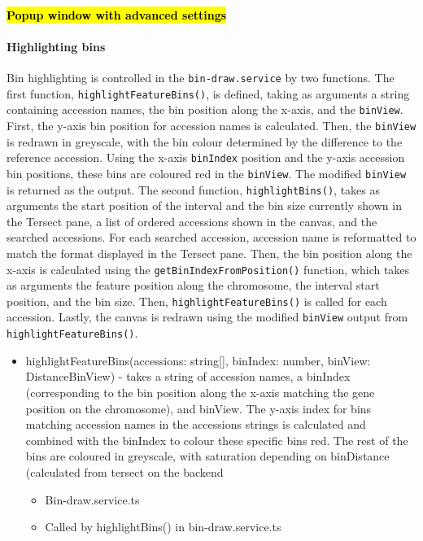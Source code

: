 \documentclass[12pt]{article}
\begin{document}
\begin{itemize}
\paragraph{\hl{Popup window with advanced settings }}
\paragraph{Highlighting bins}
Bin highlighting is controlled in the \verb+bin-draw.service+ by two functions. The first function, \verb+highlightFeatureBins()+, is defined, taking as arguments a string containing accession names, the bin position along the x-axis, and the \verb+binView+. First, the y-axis bin position for accession names is calculated. Then, the \verb+binView+ is redrawn in greyscale, with the bin colour determined by the difference to the reference accession. Using the x-axis \verb+binIndex+ position and the y-axis accession bin positions, these bins are coloured red in the \verb+binView+. The modified \verb+binView+ is returned as the output. The second function, \verb+highlightBins()+, takes as arguments the start position of the interval and the bin size currently shown in the Tersect pane, a list of ordered accessions shown in the canvas, and the searched accessions. For each searched accession, accession name is reformatted to match the format displayed in the Tersect pane. Then, the bin position along the x-axis is calculated using the \verb+getBinIndexFromPosition()+ function, which takes as arguments the feature position along the chromosome, the interval start position, and the bin size. Then, \verb+highlightFeatureBins()+ is called for each accession. Lastly, the canvas is redrawn using the modified \verb+binView+ output from \verb+highlightFeatureBins()+. 
\begin{itemize}
    \item highlightFeatureBins(accessions: string[], binIndex: number, binView: DistanceBinView) - takes a string of accession names, a binIndex (corresponding to the bin position along the x-axis matching the gene position on the chromosome), and binView. The y-axis index for bins matching accession names in the accessions strings is calculated and combined with the binIndex to colour these specific bins red. The rest of the bins are coloured in greyscale, with saturation depending on binDistance (calculated from tersect on the backend 
    \begin{itemize}
        \item Bin-draw.service.ts 
        \item Called by highlightBins() in bin-draw.service.ts 

\end{itemize}
\end{itemize}
\end{itemize}
\end{document}
